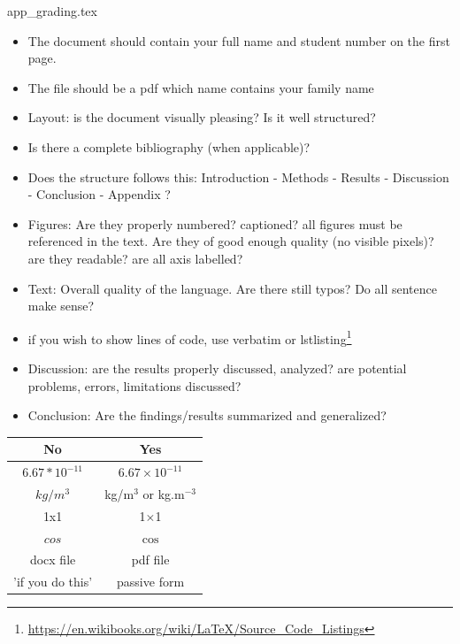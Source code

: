 \begin{flushright} {\tiny {\color{gray} app\_grading.tex}} \end{flushright}


\begin{itemize}
\item 
The document should contain your full name and student number on the first page. 
\item 
The file should be a pdf which name contains your family name
\item 
Layout: is the document visually pleasing? Is it well structured? 
\item Is there a complete bibliography (when applicable)?
\item Does the structure follows this: Introduction - Methods - Results - Discussion - Conclusion - Appendix ?
\item 
Figures: Are they properly numbered? captioned? all figures must be referenced in the text. 
Are they of good enough quality (no visible pixels)? are they readable? are all axis labelled?
\item 
Text: Overall quality of the language. Are there still typos? Do all sentence make sense?
\item if you wish to show lines of code, use verbatim or lstlisting\footnote{\url{https://en.wikibooks.org/wiki/LaTeX/Source_Code_Listings}} 
\item 
Discussion: are the results properly discussed, analyzed? are potential problems, errors, limitations discussed?
\item 
Conclusion: Are the findings/results summarized and generalized?
\end{itemize}

\begin{center}
\begin{tabular}{cc}
\hline
No & Yes \\
\hline
\hline
$6.67*10^{-11}$ & $6.67 \times 10^{-11}$ \\
$kg/m^3$ &  kg/m$^{3}$ or kg.m$^{-3}$\\
1x1 & 1$\times$1\\
$cos$ & $\cos$\\
docx file & pdf file \\
'if you do this'& passive form \\ 
\hline
\end{tabular}
\end{center}




